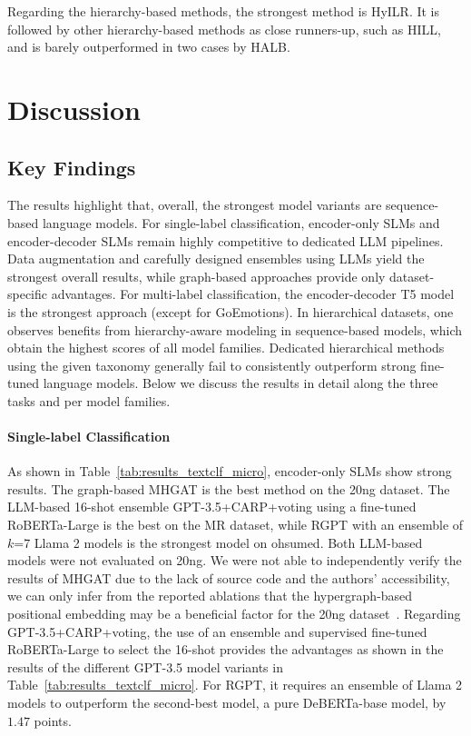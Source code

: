 \documentclass[lettersize,journal]{IEEEtran}
\newcommand{\SLMs}{SLMs\xspace}
\newcommand{\LLM}{LLM\xspace}
\begin{document}
Regarding the hierarchy-based methods, the strongest method is HyILR.
It is followed by other hierarchy-based methods as close runners-up, such as HILL, and is barely outperformed in two cases by HALB.

\section{Discussion}\label{sec:findings}

\subsection{Key Findings} 

The results highlight that, overall, the strongest model variants are sequence-based language models. 
For single-label classification, encoder-only SLMs and encoder-decoder SLMs remain highly competitive to dedicated LLM pipelines.
Data augmentation and carefully designed ensembles using LLMs yield the strongest overall results, while graph-based approaches provide only dataset-specific advantages.
For multi-label classification, the encoder-decoder T5 model is the strongest approach (except for GoEmotions).
In hierarchical datasets, one observes benefits from hierarchy-aware modeling in sequence-based models, which obtain the highest scores of all model families.
Dedicated hierarchical methods using the given taxonomy generally fail to consistently outperform strong fine-tuned language models.
Below we discuss the results in detail along the three tasks and per model families.

\paragraph{Single-label Classification}
As shown in Table~\ref{tab:results_textclf_micro}, encoder-only \SLMs show strong results. 
The graph-based MHGAT is the best method on the 20ng dataset.
The \LLM-based 16-shot ensemble GPT-3.5+CARP+voting using a fine-tuned RoBERTa-Large is the best on the MR dataset, while RGPT with an ensemble of $k$=7 Llama 2 models is the strongest model on ohsumed.
Both \LLM-based models were not evaluated on 20ng. 
We were not able to independently verify the results of MHGAT 
due to the lack of source code and the authors' accessibility, we can only infer from the reported ablations that the hypergraph-based positional embedding may be a beneficial factor for the 20ng dataset~\cite{mhgat}.
Regarding GPT-3.5+CARP+voting, the use of an ensemble and supervised fine-tuned RoBERTa-Large to select the 16-shot provides the advantages as shown in the results of the different GPT-3.5 model variants in Table~\ref{tab:results_textclf_micro}.
For RGPT, it requires an ensemble of Llama 2 models to outperform the second-best model, a pure DeBERTa-base model, by $1.47$ points.
\end{document}
